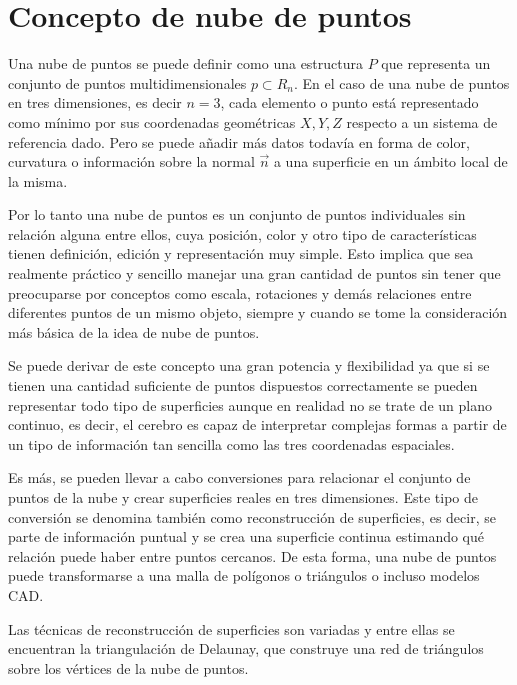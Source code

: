 \section{Concepto de nube de puntos}\label{section:nubes_ejemplo}

Una nube de puntos se puede definir como una estructura $P$ que representa un conjunto de puntos multidimensionales $p \subset R_{n}$. En el caso de una nube de puntos en tres dimensiones, es decir $n=3$, cada elemento o punto está representado como mínimo por sus coordenadas geométricas $X,Y, Z$ respecto a un sistema de referencia dado. Pero se puede añadir más datos todavía en forma de color, curvatura o información sobre la normal $\vec{n}$ a una superficie en un ámbito local de la misma.  


Por lo tanto una nube de puntos\cite{point_cloud} es un conjunto de puntos individuales sin relación alguna entre ellos, cuya
posición, color\cite{point_cloud_rgb} y otro tipo de características tienen definición, edición y representación muy simple. Esto implica que sea realmente práctico y sencillo manejar una gran cantidad de puntos sin tener que preocuparse por
conceptos como escala, rotaciones y demás relaciones entre diferentes puntos de un mismo objeto, siempre y cuando se tome la consideración más básica de la idea de nube de puntos.


Se puede derivar de este concepto una gran potencia y flexibilidad ya que si se tienen una cantidad
suficiente de puntos dispuestos correctamente se pueden representar todo tipo de superficies aunque en
realidad no se trate de un plano continuo, es decir, el cerebro es capaz de interpretar complejas formas a
partir de un tipo de información tan sencilla como las tres coordenadas espaciales.

Es más, se pueden llevar a cabo conversiones para relacionar el conjunto de puntos de la nube y crear
superficies reales en tres dimensiones. Este tipo de conversión se denomina también como reconstrucción de superficies, es decir, se parte de información puntual y se crea una superficie continua estimando qué
relación puede haber entre puntos cercanos. De esta forma, una nube de puntos puede transformarse a una
malla de polígonos o triángulos o incluso modelos CAD.

Las técnicas de reconstrucción de superficies son variadas y entre ellas se encuentran la triangulación de
Delaunay, que construye una red de triángulos sobre los vértices de la nube de puntos.

